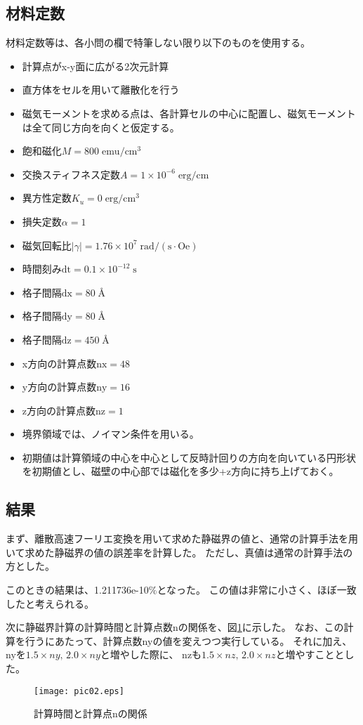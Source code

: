 \documentclass{jsarticle}
\begin{document}
\subsection{材料定数}
材料定数等は、各小問の欄で特筆しない限り以下のものを使用する。
\begin{itemize}
	\item 計算点がx-y面に広がる2次元計算
	\item 直方体をセルを用いて離散化を行う
	\item 磁気モーメントを求める点は、各計算セルの中心に配置し、磁気モーメントは全て同じ方向を向くと仮定する。
	\item 飽和磁化$M = 800\;\mathrm{emu/cm^3}$
	\item 交換スティフネス定数$A = 1\times 10^{-6}\;\mathrm{erg/cm}$
	\item 異方性定数$K_u = 0\;\mathrm{erg/cm^3}$
	\item 損失定数$\alpha = 1$
	\item 磁気回転比$\lvert\gamma\rvert = 1.76\times 10^7\;\mathrm{rad/(s\cdot Oe)}$
	\item 時間刻み$\mathrm{dt} = 0.1\times 10^{-12}\;\mathrm{s}$
	\item 格子間隔$\mathrm{dx} = 80\;$\AA
	\item 格子間隔$\mathrm{dy} = 80\;$\AA
	\item 格子間隔$\mathrm{dz} = 450\;$\AA
	\item x方向の計算点数$\mathrm{nx} = 48$
	\item y方向の計算点数$\mathrm{ny} = 16$
	\item z方向の計算点数$\mathrm{nz} = 1$
	\item 境界領域では、ノイマン条件を用いる。
	\item 初期値は計算領域の中心を中心として反時計回りの方向を向いている円形状を初期値とし、磁壁の中心部では磁化を多少+z方向に持ち上げておく。
\end{itemize}

\subsection{結果}
まず、離散高速フーリエ変換を用いて求めた静磁界の値と、通常の計算手法を用いて求めた静磁界の値の誤差率を計算した。
ただし、真値は通常の計算手法の方とした。

このときの結果は、1.211736e-10$\%$となった。
この値は非常に小さく、ほぼ一致したと考えられる。

次に静磁界計算の計算時間と計算点数nの関係を、図\ref{fig02}に示した。
なお、この計算を行うにあたって、計算点数nyの値を変えつつ実行している。
それに加え、nyを$1.5\times ny,\,2.0\times ny$と増やした際に、
nzも$1.5\times nz,\,2.0\times nz$と増やすこととした。
\begin{figure}
	\centering
	\texttt{[image: pic02.eps]}
	\caption{計算時間と計算点nの関係}
	\label{fig02}
\end{figure}
\end{document}
